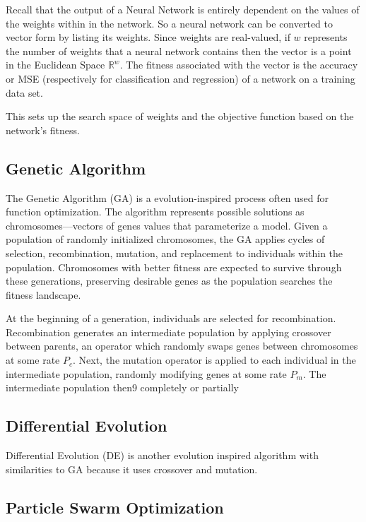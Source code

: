 \documentclass[twoside,11pt]{article}
\begin{document}
	Recall that the output of a Neural Network is entirely dependent on the values of the weights within in the network. 
	So a neural network can be converted to vector form by listing its weights.
	Since weights are real-valued, if $w$ represents the number of weights that a neural network contains then the vector is a point in the Euclidean Space $\mathbb{R}^w$. 
	The fitness associated with the vector is the accuracy or MSE (respectively for classification and regression) of a network on a training data set. 
	
	This sets up the search space of weights and the objective function based on the network's fitness.

\subsection{Genetic Algorithm}

The Genetic Algorithm (GA) is a evolution-inspired process often used for function optimization. The algorithm represents possible solutions as chromosomes---vectors of genes values that parameterize a model. Given a population of randomly initialized chromosomes, the GA applies cycles of selection, recombination, mutation, and replacement to individuals within the population. Chromosomes with better fitness are expected to survive through these generations, preserving desirable genes as the population searches the fitness landscape.

At the beginning of a generation, individuals are selected for recombination. Recombination generates an intermediate population by applying crossover between parents, an operator which randomly swaps genes between chromosomes at some rate $P_c$. Next, the mutation operator is applied to each individual in the intermediate population, randomly modifying genes at some rate $P_m$. The intermediate population then9 completely or partially 




\subsection{Differential Evolution}
Differential Evolution (DE) is another evolution inspired algorithm with  similarities to GA because it uses crossover and mutation.  
\subsection{Particle Swarm Optimization}
\end{document}
